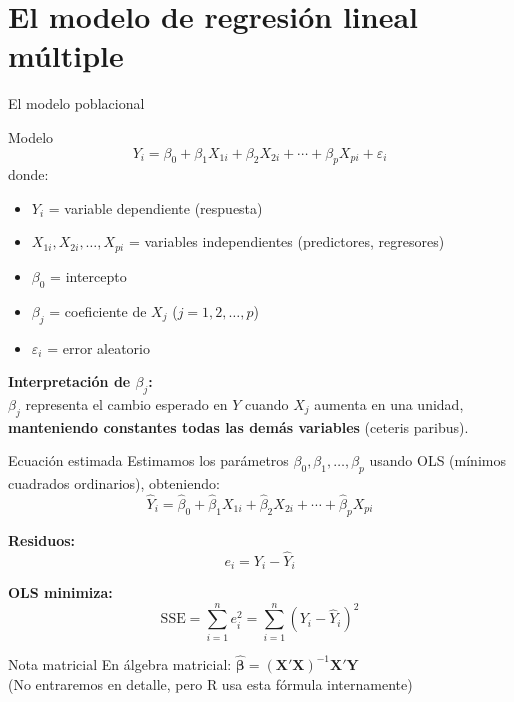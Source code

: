 \documentclass[aspectratio=169, 11pt]{beamer}
\begin{document}
\section{El modelo de regresión lineal múltiple}

\begin{frame}{El modelo poblacional}
\begin{block}{Modelo}
\[
Y_i = \beta_0 + \beta_1 X_{1i} + \beta_2 X_{2i} + \cdots + \beta_p X_{pi} + \varepsilon_i
\]
donde:
\begin{itemize}
  \item $Y_i$ = variable dependiente (respuesta)
  \item $X_{1i}, X_{2i}, \ldots, X_{pi}$ = variables independientes (predictores, regresores)
  \item $\beta_0$ = intercepto
  \item $\beta_j$ = coeficiente de $X_j$ ($j = 1, 2, \ldots, p$)
  \item $\varepsilon_i$ = error aleatorio
\end{itemize}
\end{block}

\vspace{0.2cm}
\textbf{Interpretación de $\beta_j$:}\\
$\beta_j$ representa el cambio esperado en $Y$ cuando $X_j$ aumenta en una unidad, \textbf{manteniendo constantes todas las demás variables} (ceteris paribus).
\end{frame}

\begin{frame}{Ecuación estimada}
Estimamos los parámetros $\beta_0, \beta_1, \ldots, \beta_p$ usando OLS (mínimos cuadrados ordinarios), obteniendo:
\[
\hat{Y}_i = \hat{\beta}_0 + \hat{\beta}_1 X_{1i} + \hat{\beta}_2 X_{2i} + \cdots + \hat{\beta}_p X_{pi}
\]

\vspace{0.2cm}
\textbf{Residuos:}
\[
e_i = Y_i - \hat{Y}_i
\]

\vspace{0.2cm}
\textbf{OLS minimiza:}
\[
\text{SSE} = \sum_{i=1}^{n} e_i^2 = \sum_{i=1}^{n} (Y_i - \hat{Y}_i)^2
\]

\vspace{0.2cm}
\begin{alertblock}{Nota matricial}
En álgebra matricial: $\boldsymbol{\hat{\beta}} = (\mathbf{X}'\mathbf{X})^{-1}\mathbf{X}'\mathbf{Y}$\\
(No entraremos en detalle, pero R usa esta fórmula internamente)
\end{alertblock}
\end{frame}
\end{document}
